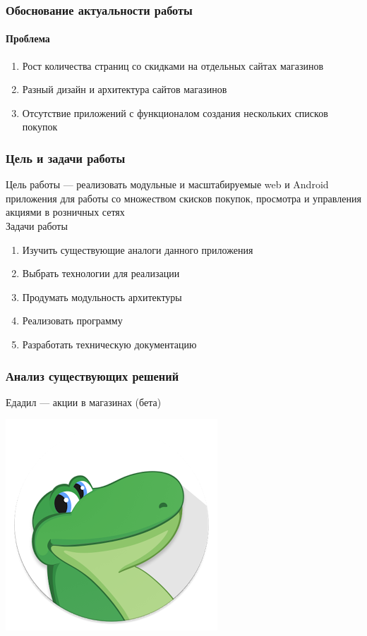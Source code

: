 \documentclass{beamer}
\begin{document}
\begin{frame}
    \frametitle{Обоснование актуальности работы}
    \framesubtitle{Проблема}
    \begin{enumerate}
        \item Рост количества страниц со скидками на отдельных сайтах магазинов
        \item Разный дизайн и архитектура сайтов магазинов
        \item Отсутствие приложений с функционалом создания нескольких списков покупок
    \end{enumerate}
\end{frame}

\begin{frame}
    \frametitle{Цель и задачи работы}
    Цель работы --- реализовать модульные и масштабируемые web и Android
    приложения для работы со множеством скисков покупок, просмотра и управления
    акциями в розничных сетях\\
    \bigskip
    Задачи работы
    \begin{enumerate}
        \item Изучить существующие аналоги данного приложения
        \item Выбрать технологии для реализации
        \item Продумать модульность архитектуры
        \item Реализовать программу
        \item Разработать техническую документацию
    \end{enumerate}
\end{frame}

\begin{frame}
\frametitle{Анализ существующих решений}
    Едадил — акции в магазинах (бета)
        \medskip
        \begin{center}
        \includegraphics[width=0.5\columnwidth]{edadeal.png}
        \end{center}
\end{frame}
\end{document}
